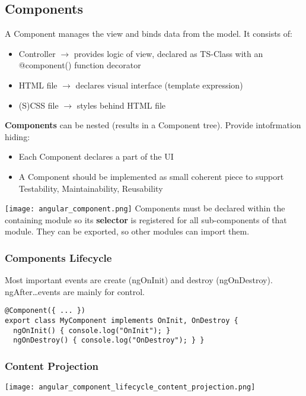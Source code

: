 \subsection{Components}
A Component manages the view and binds data from the model. It consists of:
\begin{itemize}[topsep=0pt, leftmargin=3mm]
    \setlength\itemsep{-0.3em}
    \item Controller $\rightarrow$ provides logic of view, declared as TS-Class with an @component() function decorator
    \item HTML file $\rightarrow$ declares visual interface (template expression)
    \item (S)CSS file $\rightarrow$ styles behind HTML file
\end{itemize}
\textbf{Components} can be nested (results in a Component tree). Provide intofrmation hiding:
\begin{itemize}[topsep=0pt, leftmargin=3mm]
    \setlength\itemsep{-0.3em}
    \item Each Component declares a part of the UI
    \item A Component should be implemented as small coherent piece to support \textcolor{b}{Testability}, \textcolor{b}{Maintainability}, \textcolor{b}{Reusability}
\end{itemize}
\texttt{[image: angular\_component.png]}
Components must be declared within the containing module so its \textbf{selector} is registered for all sub-components of that module. They can be exported, so other modules can import them.
\subsubsection{Components Lifecycle}
Most important events are create (ngOnInit) and destroy (ngOnDestroy). ngAfter\ldots events are mainly for control.
\begin{lstlisting}[style=htmlcssjs]
@Component({ ... })
export class MyComponent implements OnInit, OnDestroy {
  ngOnInit() { console.log("OnInit"); }
  ngOnDestroy() { console.log("OnDestroy"); } }
\end{lstlisting}
\subsubsection{Content Projection}
\texttt{[image: angular\_component\_lifecycle\_content\_projection.png]}
